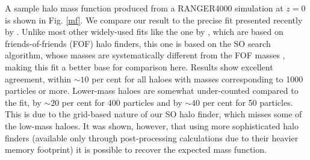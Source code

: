 \documentclass[useAMS,usenatbib]{mn2e}
\begin{document}
A sample halo mass function produced  from a RANGER4000 simulation at $z=0$ is shown in Fig. \ref{mf}. We compare our result to the 
precise fit presented recently by \citet{2008ApJ...688..709T}. Unlike most
other widely-used fits like the one by \citet{2002MNRAS.329...61S}, which are based on friends-of-friends (FOF)
halo finders, this one is based on the
SO search algorithm, whose masses are systematically different 
from the FOF masses \citep[e.g.][]{2007MNRAS.374....2R,2008ApJ...688..709T}, 
making this fit a better base for comparison here. Results show excellent
agreement, within $\sim10$ per cent for all haloes with masses corresponding to
1000 particles or more. Lower-mass haloes are somewhat under-counted compared
to the \citet{2008ApJ...688..709T} fit, by $\sim20$ per cent for 400 particles and 
by $\sim40$ per cent for 50 particles. This is due to the grid-based nature of our
SO halo finder, which misses some of the low-mass haloes. It was shown, however, that using more sophisticated
halo finders (available only through post-processing calculations due to their heavier memory
footprint) it is possible to recover the expected mass function.

%
\end{document}
